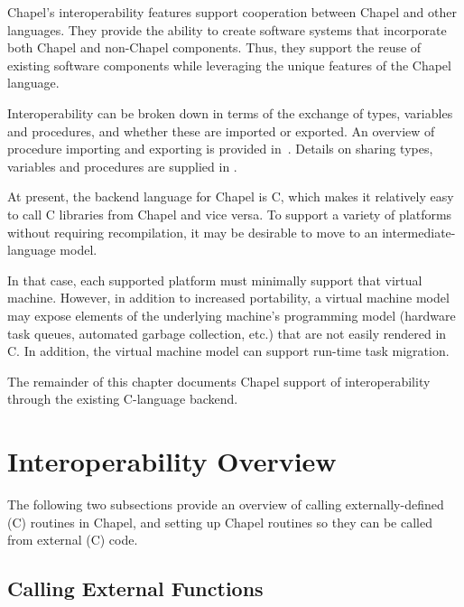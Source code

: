 \label{Interoperability}

Chapel's interoperability features support cooperation between Chapel
and other languages.  They provide the ability to create software
systems that incorporate both Chapel and non-Chapel components.
Thus, they support the reuse of existing software components while
leveraging the unique features of the Chapel language.

Interoperability can be broken down in terms of the exchange of types, variables
and procedures, and whether these are imported or exported.  An overview of
procedure importing and exporting is provided in~.
Details on sharing types, variables and procedures are supplied
in .

\begin{future}

At present, the backend language for Chapel is C, which makes it relatively
easy to call C libraries from Chapel and vice versa.  To support a variety of
platforms without requiring recompilation, it may be desirable to move
to an intermediate-language model.

In that case, each supported platform must minimally support that virtual
machine.  However, in addition to increased portability, a virtual machine
model may expose elements of the underlying machine's programming model
(hardware task queues, automated garbage collection, etc.) that are not easily
rendered in C.  In addition, the virtual machine model can support run-time task
migration.

\end{future}

The remainder of this chapter documents Chapel support of interoperability through
the existing C-language backend.

\section{Interoperability Overview}
\label{Interop_Overview}

The following two subsections provide an overview of calling externally-defined
(C) routines in Chapel, and setting up Chapel routines so they can be called
from external (C) code.

\subsection{Calling External Functions}
\label{Calling_External_Functions}

